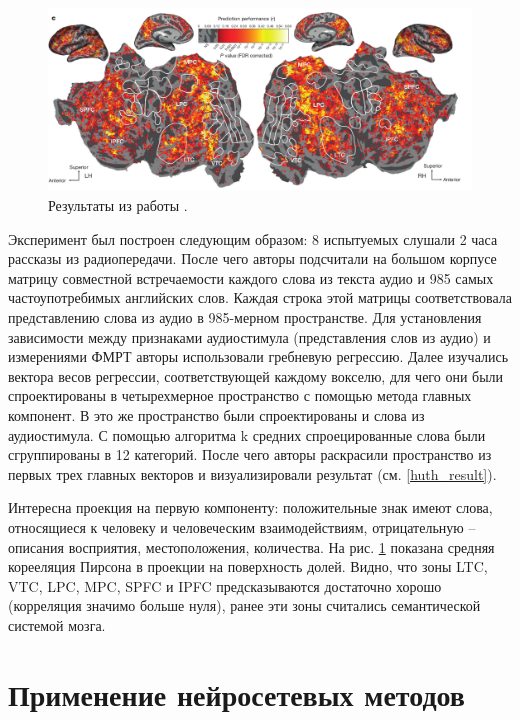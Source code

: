 \documentclass[pdftex,ptm,12pt,a4paper]{report}
\theoremstyle{definition}
\begin{document}
\begin{figure}[h]
\includegraphics[scale=0.4]{images/map_result_huth.png}
\centering
\caption{Результаты из работы \cite{huth2016natural}.}
\label{map_huth_result}
\end{figure}

Эксперимент был построен следующим образом: 8 испытуемых слушали 2 часа рассказы из радиопередачи. После чего авторы подсчитали на большом корпусе матрицу совместной встречаемости каждого слова из текста аудио и 985 самых частоупотребимых английских слов. Каждая строка этой матрицы соответствовала представлению слова из аудио в 985-мерном пространстве. Для установления зависимости между признаками аудиостимула (представления слов из аудио) и измерениями ФМРТ авторы использовали гребневую регрессию. Далее изучались вектора весов регрессии, соответствующей каждому вокселю, для чего они были спроектированы в четырехмерное пространство с помощью метода главных компонент. В это же пространство были спроектированы и слова из аудиостимула. С помощью алгоритма k средних спроецированные слова были сгруппированы в 12 категорий. После чего авторы раскрасили пространство из первых трех главных векторов и визуализировали результат (см. \ref{huth_result}). 

Интересна проекция на первую компоненту: положительные знак имеют слова, относящиеся к человеку и человеческим взаимодействиям, отрицательную -- описания восприятия, местоположения, количества. На рис. \ref{map_huth_result} показана средняя корееляция Пирсона в проекции на поверхность долей. Видно, что зоны LTC, VTC, LPC, MPC, SPFC и IPFC предсказываются достаточно хорошо (корреляция значимо больше нуля), ранее эти зоны считались семантической системой мозга.


\section{Применение нейросетевых методов}
\end{document}
